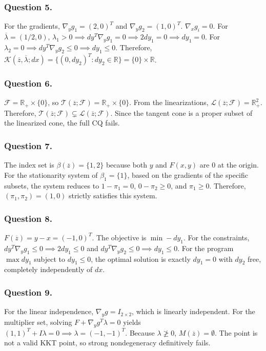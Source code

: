 \documentclass[pdflatex,sn-mathphys-num]{sn-jnl}%
\theoremstyle{definition}
\begin{document}
\subsubsection*{Question 5.}
For the gradients, $\nabla_y g_1 = (2,0)^T$ and $\nabla_y g_2 = (1,0)^T$. $\nabla_x g_i = 0$.
For $\overline{\lambda} = (1/2, 0)$, $\lambda_1 > 0 \implies dy^T \nabla_y g_1 = 0 \implies 2dy_1 = 0 \implies dy_1 = 0$. For $\lambda_2 = 0 \implies dy^T \nabla_y g_2 \le 0 \implies dy_1 \le 0$.
Therefore, $\mathcal{K}(\overline{z}, \overline{\lambda}; dx) = \{(0, dy_2)^T : dy_2 \in \mathbb{R}\} = \{0\} \times \mathbb{R}$.

\subsubsection*{Question 6.}
$\mathcal{F} = \mathbb{R}_+ \times \{0\}$, so $\mathcal{T}(\overline{z}; \mathcal{F}) = \mathbb{R}_+ \times \{0\}$. From the linearizations, $\mathcal{L}(\overline{z}; \mathcal{F}) = \mathbb{R}_+^2$.
Therefore, $\mathcal{T}(\overline{z}; \mathcal{F}) \subsetneq \mathcal{L}(\overline{z}; \mathcal{F})$. Since the tangent cone is a proper subset of the linearized cone, the full CQ fails.

\subsubsection*{Question 7.}
The index set is $\beta(\overline{z}) = \{1, 2\}$ because both $y$ and $F(x,y)$ are $0$ at the origin.
For the stationarity system of $\beta_1=\{1\}$, based on the gradients of the specific subsets, the system reduces to $1 - \pi_1 = 0$, $0 - \pi_2 \ge 0$, and $\pi_1 \ge 0$.
Therefore, $(\pi_1, \pi_2) = (1, 0)$ strictly satisfies this system.

\subsubsection*{Question 8.}
$F(\overline{z}) = y-x = (-1,0)^T$. The objective is $\min -dy_1$.
For the constraints, $dy^T \nabla_y g_1 \le 0 \implies 2dy_1 \le 0$ and $dy^T \nabla_y g_2 \le 0 \implies dy_1 \le 0$. 
For the program $\max dy_1$ subject to $dy_1 \le 0$, the optimal solution is exactly $dy_1 = 0$ with $dy_2$ free, completely independently of $dx$.

\subsubsection*{Question 9.}
For the linear independence, $\nabla_y g = I_{2 \times 2}$, which is linearly independent.
For the multiplier set, solving $F + \nabla_y g^T \lambda = 0$ yields $(1,1)^T + I\lambda = 0 \implies \lambda = (-1,-1)^T$. 
Because $\lambda \not\ge 0$, $M(\overline{z}) = \emptyset$. The point is not a valid KKT point, so strong nondegeneracy definitively fails.
\end{document}
